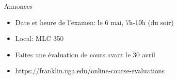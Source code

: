 \begin{frame}{Annonces}
  \begin{itemize}
    \item Date et heure de l'examen: le 6 mai, 7h-10h (du soir)
    \item Local: MLC 350
    \item Faites une évaluation de cours avant le 30 avril
    \item \url{https://franklin.uga.edu/online-course-evaluations}
  \end{itemize}
\end{frame}